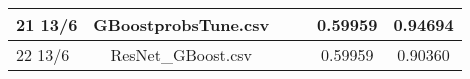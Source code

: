 \begin{landscape}
\begin{table}[H]
\begin{tabular}{|l|c|c|c|c|c|}
21 13/6                                                   & GBoostprobsTune.csv                                          &                           &                              & 0.59959                                                             & 0.94694               \\ \hline
22 13/6                                                   & ResNet\_GBoost.csv                                           &                           &                              & 0.59959                                                             & 0.90360               \\ \hline
\end{tabular}
\end{table}
\end{landscape}